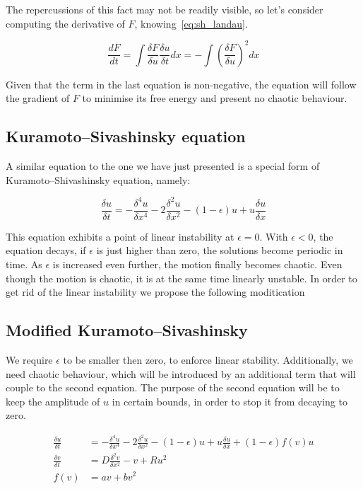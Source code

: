 \documentclass[11pt,a4paper]{article}
\begin{document}
The repercussions of this fact may not be readily visible, so let's consider computing the derivative of $F$, knowing~\eqref{eq:sh_landau}.

\begin{equation}\label{eq:sh_der}
    \frac{dF}{dt} = \int\frac{\delta F}{\delta u} \frac{\delta u}{\delta t}dx = -\int (\frac{\delta F}{\delta u})^2 dx
\end{equation}

Given that the term in the last equation is non-negative, the equation will follow the gradient of $F$ to minimise its free energy and present no chaotic behaviour.

\subsection{Kuramoto--Sivashinsky equation}
A similar equation to the one we have just presented is a special form of Kuramoto--Shivashinsky\cite{Hayman86} equation, namely:

\begin{equation}\label{eq:ks1}
    \frac{\delta u}{\delta t} = -\frac{\delta^4 u}{\delta x^4} - 2\frac{\delta^2u}{\delta x^2} - (1 - \epsilon)u + u\frac{\delta u}{\delta x}
\end{equation}

This equation exhibits a point of linear instability at $\epsilon = 0$.
With $\epsilon < 0$, the equation decays, if $\epsilon$ is just higher than zero, the solutions become periodic in time.
As $\epsilon$ is increased even further, the motion finally becomes chaotic.
Even though the motion is chaotic, it is at the same time linearly unstable.
In order to get rid of the linear instability we propose the following moditication

\subsection{Modified Kuramoto--Sivashinsky}
We require $\epsilon$ to be smaller then zero, to enforce linear stability.
Additionally, we need chaotic behaviour, which will be introduced by an additional term that will couple to the second equation.
The purpose of the second equation will be to keep the amplitude of $u$ in certain bounds, in order to stop it from decaying to zero.

\begin{equation}\label{eq:our1}
    \begin{split}
        \frac{\delta u}{\delta t} &= -\frac{\delta^4u}{\delta x^4} - 2\frac{\delta^2u}{\delta x^2} - (1 - \epsilon)u + u\frac{\delta u}{\delta x} + (1 - \epsilon)f(v)u \\
        \frac{\delta v}{\delta t} &= D\frac{\delta^2 v}{\delta x^2} - v + Ru^2 \\
        f(v) &= av + bv^2
\end{split}
\end{equation}
\end{document}
